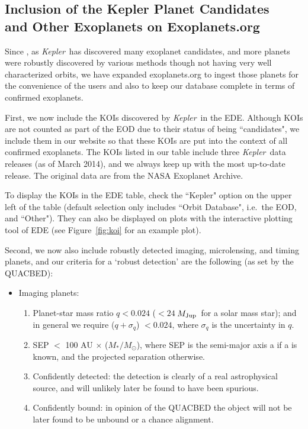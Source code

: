 \documentclass[11pt,preprint]{aastex}
\def\kepler{\textit{Kepler}}
\def\mjup{$M_{\rm Jup}$}
\begin{document}
\begin{CJK*}{UTF8}{gbsn}
\section{Inclusion of the Kepler Planet Candidates \\
  and Other Exoplanets on Exoplanets.org}\label{sec:kepler}

Since \cite{Wright2011}, as \kepler\ has discovered many exoplanet
candidates, and more planets were robustly discovered by various
methods though not having very well characterized orbits, we have
expanded exoplanets.org to ingest those planets for the convenience of
the users and also to keep our database complete in terms of confirmed
exoplanets.

First, we now include the KOIs discovered by \kepler\ in the
EDE. Although KOIs are not counted as part of the EOD due to their
status of being ``candidates", we include them in our website so that
these KOIs are put into the context of all confirmed exoplanets. The
KOIs listed in our table include three \kepler\ data releases (as of
March 2014), and we always keep up with the most up-to-date
release. The original data are from the NASA Exoplanet Archive.

To display the KOIs in the EDE table, check the ``Kepler" option on
the upper left of the table (default selection only includes ``Orbit
Database", i.e.~the EOD, and ``Other"). They can also be displayed on
plots with the interactive plotting tool of EDE (see
Figure~\ref{fig:koi} for an example plot).

Second, we now also include robustly detected imaging, microlensing,
and timing planets, and our criteria for a `robust detection' are the
following (as set by the QUACBED):

\begin{itemize}
\item Imaging planets:
\begin{enumerate}
\item Planet-star mass ratio $q < 0.024$ ($< 24\ $\mjup\ for a solar
  mass star); and in general we require ($q+\sigma_q$) $< 0.024$,
  where $\sigma_q$ is the uncertainty in $q$.
\item SEP $<$ 100 AU $\times$ ($M_*/M_\odot$), where SEP is the
  semi-major axis a if a is known, and the projected separation
  otherwise.
\item Confidently detected: the detection is clearly of a real
  astrophysical source, and will unlikely later be found to have been
  spurious.
\item Confidently bound: in opinion of the QUACBED the object will not
  be later found to be unbound or a chance alignment.


\end{enumerate}
\end{itemize}
\end{CJK*}
\end{document}
